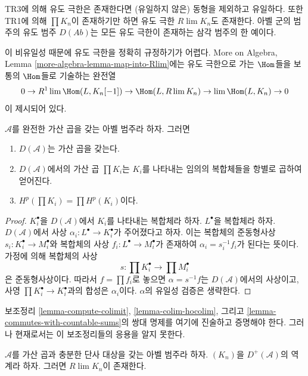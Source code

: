 \noindent
TR3에 의해 유도 극한은 존재한다면 (유일하지 않은) 동형을 제외하고
유일하다. 또한 TR1에 의해 $\prod K_n$이 존재하기만 하면 유도 극한
$R\lim K_n$도 존재한다. 아벨 군의 범주의 유도 범주 $D(\textit{Ab})$는
모든 유도 극한이 존재하는 삼각 범주의 한 예이다.

\medskip\noindent
이 비유일성 때문에 유도 극한을 정확히 규정하기가 어렵다.
More on Algebra, Lemma \ref{more-algebra-lemma-map-into-Rlim}에는
유도 극한으로 가는 $\Hom$들을 보통의 $\Hom$들로 기술하는 완전열
$$
0 \to R^1\lim \Hom(L, K_n[-1]) \to \Hom(L, R\lim K_n)
\to \lim \Hom(L, K_n) \to 0
$$
이 제시되어 있다.

\begin{lemma}
\label{lemma-products}
$\mathcal{A}$를 완전한 가산 곱을 갖는 아벨 범주라 하자. 그러면
\begin{enumerate}
\item $D(\mathcal{A})$는 가산 곱을 갖는다.
\item $D(\mathcal{A})$에서의 가산 곱 $\prod K_i$는 $K_i$를 나타내는
임의의 복합체들을 항별로 곱하여 얻어진다.
\item $H^p(\prod K_i) = \prod H^p(K_i)$이다.
\end{enumerate}
\end{lemma}

\begin{proof}
$K_i^\bullet$을 $D(\mathcal{A})$에서 $K_i$를 나타내는 복합체라 하자.
$L^\bullet$을 복합체라 하자. $D(\mathcal{A})$에서 사상
$\alpha_i : L^\bullet \to K_i^\bullet$가 주어졌다고 하자.
이는 복합체의 준동형사상 $s_i : K_i^\bullet \to M_i^\bullet$와
복합체의 사상 $f_i : L^\bullet \to M_i^\bullet$가 존재하여
$\alpha_i = s_i^{-1}f_i$가 된다는 뜻이다. 가정에 의해 복합체의 사상
$$
s : \prod K_i^\bullet \longrightarrow \prod M_i^\bullet
$$
은 준동형사상이다. 따라서 $f = \prod f_i$로 놓으면
$\alpha = s^{-1}f$는 $D(\mathcal{A})$에서의 사상이고, 사영
$\prod K_i^\bullet \to K_i^\bullet$과의 합성은 $\alpha_i$이다.
$\alpha$의 유일성 검증은 생략한다.
\end{proof}

\noindent
보조정리 \ref{lemma-compute-colimit},
\ref{lemma-colim-hocolim}, 그리고
\ref{lemma-commutes-with-countable-sums}의 쌍대 명제를 여기에 진술하고
증명해야 한다. 그러나 현재로서는 이 보조정리들의 응용을 알지 못한다.

\begin{lemma}
\label{lemma-inverse-limit-bounded-below}
$\mathcal{A}$를 가산 곱과 충분한 단사 대상을 갖는 아벨 범주라 하자.
$(K_n)$을 $D^+(\mathcal{A})$의 역계라 하자. 그러면 $R\lim K_n$이 존재한다.
\end{lemma}

